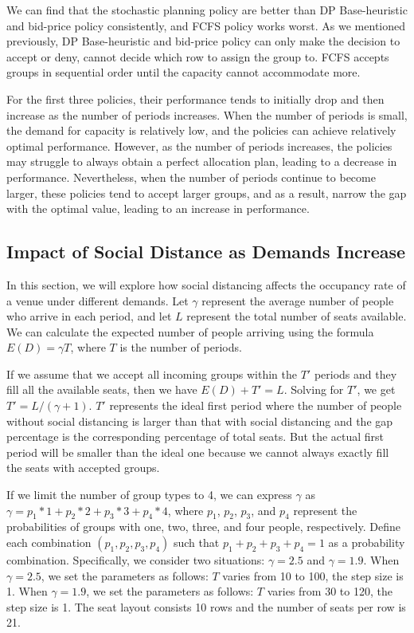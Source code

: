 We can find that the stochastic planning policy are better than DP Base-heuristic and bid-price policy consistently, and FCFS policy works worst. As we mentioned previously, DP Base-heuristic and bid-price policy can only make the decision to accept or deny, cannot decide which row to assign the group to. FCFS accepts groups in sequential order until the capacity cannot accommodate more.


For the first three policies, their performance tends to initially drop and then increase as the number of periods increases. When the number of periods is small, the demand for capacity is relatively low, and the policies can achieve relatively optimal performance. However, as the number of periods increases, the policies may struggle to always obtain a perfect allocation plan, leading to a decrease in performance. Nevertheless, when the number of periods continue to become larger, these policies tend to accept larger groups, and as a result, narrow the gap with the optimal value, leading to an increase in performance.


\subsection{Impact of Social Distance as Demands Increase}
In this section, we will explore how social distancing affects the occupancy rate of a venue under different demands. Let $\gamma$ represent the average number of people who arrive in each period, and let $L$ represent the total number of seats available. We can calculate the expected number of people arriving using the formula $E(D) = \gamma T$, where $T$ is the number of periods. 

If we assume that we accept all incoming groups within the $T{'}$ periods and they fill all the available seats, then we have $E(D) + T{'} = L$. Solving for $T{'}$, we get $T{'} = L/(\gamma + 1)$. 
$T{'}$ represents the ideal first period where the number of people without social distancing is larger than that with social distancing and the gap percentage is the corresponding percentage of total seats. But the actual first period will be smaller than the ideal one because we cannot always exactly fill the seats with accepted groups. 


If we limit the number of group types to 4, we can express $\gamma$ as $\gamma = p_1 * 1 + p_2 * 2 + p_3 * 3 + p_4 * 4$, where $p_1$, $p_2$, $p_3$, and $p_4$ represent the probabilities of groups with one, two, three, and four people, respectively. Define each combination $(p_1, p_2, p_3, p_4)$ such that $p_1 + p_2 + p_3 + p_4 = 1$ as a probability combination. Specifically, we consider two situations: $\gamma = 2.5$ and $\gamma = 1.9$. When $\gamma = 2.5$, we set the parameters as follows: $T$ varies from 10 to 100, the step size is 1. When $\gamma = 1.9$, we set the parameters as follows: $T$ varies from 30 to 120, the step size is 1. The seat layout consists 10 rows and the number of seats per row is 21.

